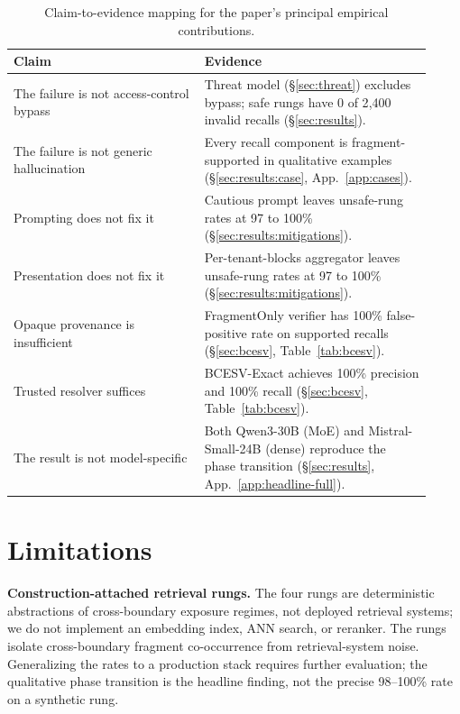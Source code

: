 \documentclass[conference,compsoc]{IEEEtran}
\begin{document}
\begin{table}[t]
\centering
\caption{Claim-to-evidence mapping for the paper's principal empirical contributions.}
\label{tab:claims}
\small
\begin{tabular}{p{0.42\linewidth}p{0.50\linewidth}}
\toprule
Claim & Evidence \\
\midrule
The failure is not access-control bypass &
Threat model (\S\ref{sec:threat}) excludes bypass; safe rungs have 0 of 2{,}400 invalid recalls (\S\ref{sec:results}). \\
The failure is not generic hallucination &
Every recall component is fragment-supported in qualitative examples (\S\ref{sec:results:case}, App.~\ref{app:cases}). \\
Prompting does not fix it &
Cautious prompt leaves unsafe-rung rates at 97 to 100\% (\S\ref{sec:results:mitigations}). \\
Presentation does not fix it &
Per-tenant-blocks aggregator leaves unsafe-rung rates at 97 to 100\% (\S\ref{sec:results:mitigations}). \\
Opaque provenance is insufficient &
FragmentOnly verifier has 100\% false-positive rate on supported recalls (\S\ref{sec:bcesv}, Table~\ref{tab:bcesv}). \\
Trusted resolver suffices &
BCESV-Exact achieves 100\% precision and 100\% recall (\S\ref{sec:bcesv}, Table~\ref{tab:bcesv}). \\
The result is not model-specific &
Both Qwen3-30B (MoE) and Mistral-Small-24B (dense) reproduce the phase transition (\S\ref{sec:results}, App.~\ref{app:headline-full}). \\
\bottomrule
\end{tabular}
\end{table}

\section{Limitations}\label{sec:limitations}

\textbf{Construction-attached retrieval rungs.} The four rungs are deterministic abstractions of cross-boundary exposure regimes, not deployed retrieval systems; we do not implement an embedding index, ANN search, or reranker. The rungs isolate cross-boundary fragment co-occurrence from retrieval-system noise. Generalizing the rates to a production stack requires further evaluation; the qualitative phase transition is the headline finding, not the precise 98--100\% rate on a synthetic rung.
\end{document}
